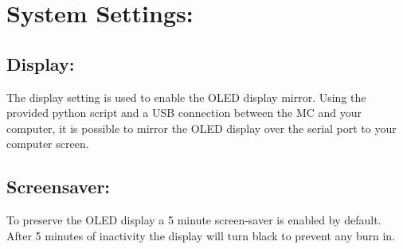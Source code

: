 \chapter{System Settings:}

\section{Display:}
The display setting is used to enable the OLED display mirror. Using the provided python script and a USB connection between the MC and your computer, it is possible to mirror the OLED display over the serial port to your computer screen.
\section{Screensaver:}
To preserve the OLED display a 5 minute screen-saver is enabled by default. After 5 minutes of inactivity the display will turn black to prevent any burn in.